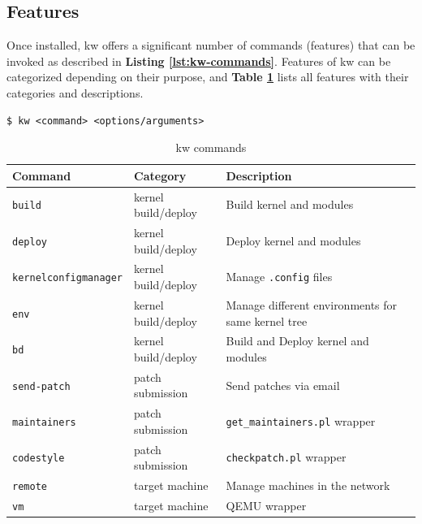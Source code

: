 \subsection{Features}

Once installed, kw offers a significant number of commands (features) that can
be invoked as described in \textbf{Listing \ref{lst:kw-commands}}. Features of
kw can be categorized depending on their purpose, and \textbf{Table
\ref{tab:kw-commands}} lists all features with their categories and
descriptions.

\begin{lstlisting}[caption={kw commands invocation.}, label={lst:kw-commands}]
$ kw <command> <options/arguments>
\end{lstlisting}

\begin{table}[ht]
    \caption{kw commands}
    \label{tab:kw-commands}
    \begin{center}
    \begin{tabular}{|p{}|p{}|p{}|}
        \hline
        \rowcolor{gray!20}
        \textbf{Command} & \textbf{Category} & \textbf{Description} \\\hline
        \texttt{build}    & kernel build/deploy    & Build kernel and modules \\\hline
        \texttt{deploy}    & kernel build/deploy    & Deploy kernel and modules \\\hline
        \texttt{kernel\-config\-manager}    & kernel build/deploy    & Manage \texttt{.config} files \\\hline
        \texttt{env}    & kernel build/deploy    & Manage different environments for same kernel tree \\\hline
        \texttt{bd}    & kernel build/deploy    & Build and Deploy kernel and modules \\\hline
        \texttt{send-patch}    & patch submission    & Send patches via email \\\hline
        \texttt{maintainers}    & patch submission    & \texttt{get\_maintai\-ners.pl} wrapper \\\hline
        \texttt{codestyle}    & patch submission    & \texttt{checkpatch.pl} wrapper \\\hline
        \texttt{remote}    & target machine    & Manage machines in the network \\\hline
        \texttt{vm}    & target machine    & QEMU wrapper \\\hline

\end{tabular}
\end{center}
\end{table}
